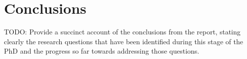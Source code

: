 \chapter{Conclusions}
TODO: Provide a succinct account of the conclusions from the report, stating clearly the research questions that have been identified during this stage of the PhD and the progress so far towards addressing those questions.